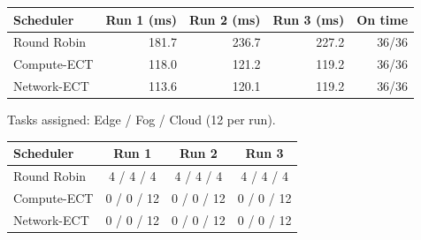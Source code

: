 \begin{table}[H]
\centering
\label{table:example-a:start}
\begin{tabular}{lrrrr}
\toprule
\textbf{Scheduler} & \textbf{Run 1 (ms)} & \textbf{Run 2 (ms)} & \textbf{Run 3 (ms)} & \textbf{On time} \\
\midrule
Round Robin & 181.7 & 236.7 & 227.2 & 36/36 \\
Compute-ECT & 118.0 & 121.2 & 119.2 & 36/36 \\
Network-ECT & 113.6 & 120.1 & 119.2 & 36/36 \\
\bottomrule
\end{tabular}
\par\smallskip
{\small Tasks assigned: Edge / Fog / Cloud (12 per run).}\par\smallskip
\begin{tabular}{lccc}
\toprule
\textbf{Scheduler} & \textbf{Run 1} & \textbf{Run 2} & \textbf{Run 3} \\
\midrule
Round Robin & 4 / 4 / 4 & 4 / 4 / 4 & 4 / 4 / 4 \\
Compute-ECT & 0 / 0 / 12 & 0 / 0 / 12 & 0 / 0 / 12 \\
Network-ECT & 0 / 0 / 12 & 0 / 0 / 12 & 0 / 0 / 12 \\
\bottomrule
\end{tabular}
\label{table:example-a:end}
\end{table}
